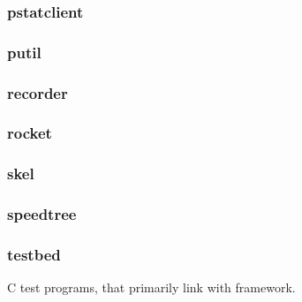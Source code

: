 \documentclass[a4paper]{article}
\begin{document}
\clearpage\subsubsection[pstatclient]{pstatclient}
\hypertarget{RefHeading22211167907073}{}\subsubsection{}
\clearpage\subsubsection[putil]{putil}
\hypertarget{RefHeading22231167907073}{}\subsubsection{}
\clearpage\subsubsection[recorder]{recorder}
\hypertarget{RefHeading22251167907073}{}\subsubsection{}
\clearpage\subsubsection[rocket]{rocket}
\hypertarget{RefHeading22271167907073}{}\subsubsection{}
\clearpage\subsubsection[skel]{skel}
\hypertarget{RefHeading22291167907073}{}\subsubsection{}
\clearpage\subsubsection[speedtree]{speedtree}
\hypertarget{RefHeading22311167907073}{}\subsubsection{}
\clearpage\subsubsection[testbed]{testbed}
\hypertarget{RefHeading22331167907073}{}{\color{black}
C test programs, that primarily link with framework.}
\end{document}
